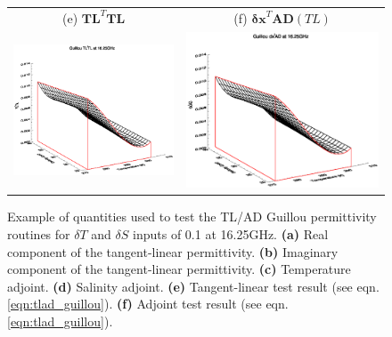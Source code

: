 \begin{figure}[htp]
\begin{tabular}{c c}
    \textsf{(e)} $\mathbf{TL}^{T}\mathbf{TL}$ &
    \textsf{(f)} $\mathbf{\delta x}^{T}\mathbf{AD}(TL)$ \\
    \includegraphics[bb=120 240 508 540,clip,scale=0.5]{graphics/Guillou/TLAD/TLtTL_16.25GHz.eps} & 
    \includegraphics[bb=120 240 508 540,clip,scale=0.5]{graphics/Guillou/TLAD/dxtAD_16.25GHz.eps}
  \end{tabular}
  \caption{Example of quantities used to test the TL/AD Guillou permittivity routines for $\delta{T}$ and $\delta{S}$ inputs of 0.1 at 16.25GHz. \textbf{(a)} Real component of the tangent-linear permittivity.  \textbf{(b)} Imaginary component of the tangent-linear permittivity. \textbf{(c)} Temperature adjoint. \textbf{(d)} Salinity adjoint. \textbf{(e)} Tangent-linear test result (see eqn.\ref{eqn:tlad_guillou}). \textbf{(f)} Adjoint test result (see eqn.\ref{eqn:tlad_guillou}).}
  \label{fig:tlad_16.25GHz_guillou}
\end{figure}

